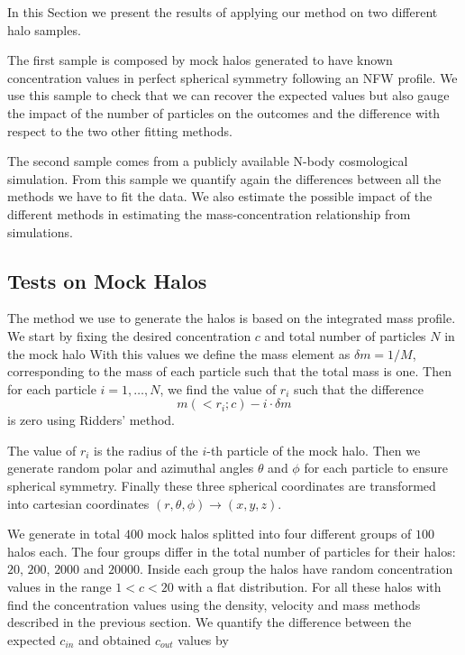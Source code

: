 \documentclass[useAMS,usenatbib]{mn2e}
\begin{document}
In this Section we present the results of applying our method on two
different halo samples.

The first sample is composed by mock halos generated to have known
concentration values in perfect spherical symmetry following an NFW
profile. 
We use this sample to check that we can recover the expected values
but also gauge the impact of the number of particles on the outcomes
and the difference with respect to the two other fitting methods.


The second sample comes from a publicly available N-body cosmological
simulation. 
From this sample we quantify again the differences between all the
methods we have to fit the data.
We also estimate the possible impact of the different methods in
estimating the mass-concentration relationship from simulations. 

\subsection{Tests on Mock Halos}

The method we use to generate the halos is based on the integrated
mass profile. 
We start by fixing the desired concentration $c$ and total number of
particles $N$ in the mock halo 
With this values we define the mass element as $\delta m = 1/M$, corresponding
to the mass of each particle such that the total mass is one. 
Then for each particle $i=1,\ldots,N$, we find the value of $r_i$ such that
the difference
%
\begin{equation}
m(<r_i;c) - i \cdot \delta m
\end{equation}
%
is zero using Ridders' method. 

The value of $r_i$ is the radius of the $i$-th particle of the mock
halo.
Then we generate random polar and azimuthal angles $\theta$ and $\phi$
for each particle to ensure spherical symmetry. 
Finally these three spherical coordinates are transformed into cartesian coordinates
$(r,\theta,\phi) \rightarrow (x,y,z)$.



We generate in total $400$ mock halos splitted into four different
groups of $100$ halos each. 
The four groups differ in the total number of particles for their halos:
$20$, $200$, $2000$ and $20000$.
Inside each group the halos have random concentration values in
the range $1<c<20$ with a flat distribution. 
For all these halos with find the concentration values using the
density, velocity and mass methods described in the previous
section. We quantify the difference between the expected $c_{in}$
and obtained $c_{out}$ values by 
\end{document}
